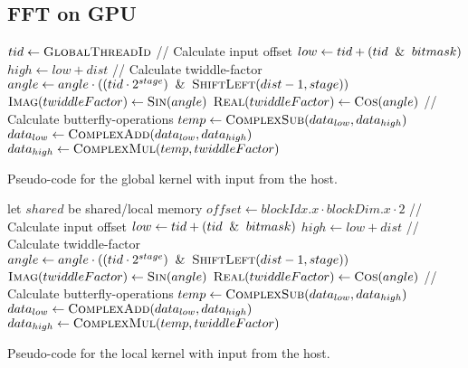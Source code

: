 \subsection{FFT on GPU}

\begin{algorithm}
	\centering
	\begin{algorithmic}[1]
            \State $tid \gets \Call{GlobalThreadId}{}$
            \newline
            \State // Calculate input offset          
            \State $low \gets tid + (tid \And bitmask)$
            \State $high \gets low + dist$            
            \newline
            \State // Calculate twiddle-factor
            \State $angle \gets angle \cdot ((tid \cdot 2^{stage}) \And \Call{ShiftLeft}{dist - 1, stage})$
            \State $\Call{Imag}{twiddleFactor} \gets \Call{Sin}{angle}$
            \State $\Call{Real}{twiddleFactor} \gets \Call{Cos}{angle}$
            \newline
            \State // Calculate butterfly-operations
            \State $temp \gets \Call{ComplexSub}{data_{low}, data_{high}}$
            \State $data_{low} \gets \Call{ComplexAdd}{data_{low}, data_{high}}$
            \State $data_{high} \gets \Call{ComplexMul}{temp, twiddleFactor}$
        \EndProcedure
	\end{algorithmic}
	\caption{Pseudo-code for the global kernel with input from the host.}
	\label{alg:device:global-kernel}
\end{algorithm}

\begin{algorithm}
	\centering
	\begin{algorithmic}[1]
            \State let $shared$ be shared/local memory
            \State $offset \gets blockIdx.x \cdot blockDim.x \cdot 2$
            \State // Calculate input offset          
            \State $low \gets tid + (tid \And bitmask)$
            \State $high \gets low + dist$            
            \newline
            \State // Calculate twiddle-factor
            \State $angle \gets angle \cdot ((tid \cdot 2^{stage}) \And \Call{ShiftLeft}{dist - 1, stage})$
            \State $\Call{Imag}{twiddleFactor} \gets \Call{Sin}{angle}$
            \State $\Call{Real}{twiddleFactor} \gets \Call{Cos}{angle}$
            \newline
            \State // Calculate butterfly-operations
            \State $temp \gets \Call{ComplexSub}{data_{low}, data_{high}}$
            \State $data_{low} \gets \Call{ComplexAdd}{data_{low}, data_{high}}$
            \State $data_{high} \gets \Call{ComplexMul}{temp, twiddleFactor}$
        \EndProcedure
	\end{algorithmic}
	\caption{Pseudo-code for the local kernel with input from the host.}
	\label{alg:device:local-kernel}
\end{algorithm}